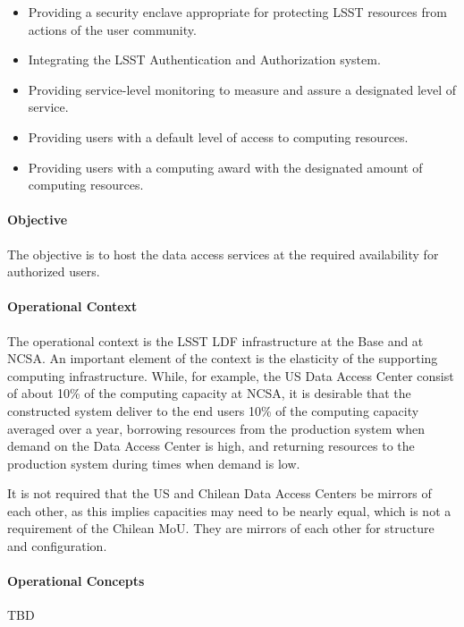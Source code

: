 \begin{itemize}
\item Providing a security enclave appropriate for protecting LSST resources from actions of the user community.

\item Integrating the LSST Authentication and Authorization system.

\item Providing service-level monitoring to measure and assure a designated level of service.

\item Providing users with a default level of access to computing resources.

\item Providing users with a computing award with the designated amount of computing resources.

\end{itemize}

\paragraph{Objective}

The objective is to host the data access services at the required availability for authorized users.

\paragraph{Operational Context}

The operational context is the LSST LDF infrastructure at the Base and at NCSA. An important element of the context is the elasticity of the supporting computing infrastructure. While, for example, the US Data Access Center consist of about 10\% of the computing capacity at NCSA, it is desirable that the constructed system deliver to the end users 10\% of the computing capacity averaged over a year, borrowing resources from the production system when demand on the Data Access Center is high, and returning resources to the production system during times when demand is low.

It is not required that the US and Chilean Data Access Centers be mirrors of each other, as this implies capacities may need to be nearly equal, which is not a requirement of the Chilean MoU. They are mirrors of each other for structure and configuration.

\paragraph{Operational Concepts}
TBD
